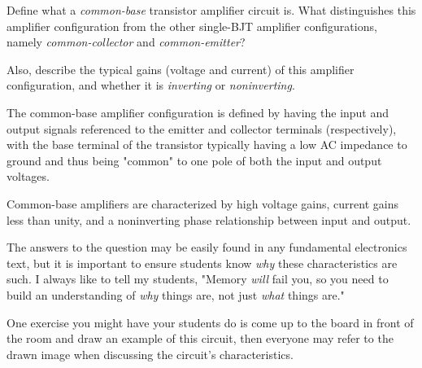 

Define what a {\it common-base} transistor amplifier circuit is.  What distinguishes this amplifier configuration from the other single-BJT amplifier configurations, namely {\it common-collector} and {\it common-emitter}?

Also, describe the typical gains (voltage and current) of this amplifier configuration, and whether it is {\it inverting} or {\it noninverting}.







The common-base amplifier configuration is defined by having the input and output signals referenced to the emitter and collector terminals (respectively), with the base terminal of the transistor typically having a low AC impedance to ground and thus being "common" to one pole of both the input and output voltages.  

Common-base amplifiers are characterized by high voltage gains, current gains less than unity, and a noninverting phase relationship between input and output.







The answers to the question may be easily found in any fundamental electronics text, but it is important to ensure students know {\it why} these characteristics are such.  I always like to tell my students, "Memory {\it will} fail you, so you need to build an understanding of {\it why} things are, not just {\it what} things are."

One exercise you might have your students do is come up to the board in front of the room and draw an example of this circuit, then everyone may refer to the drawn image when discussing the circuit's characteristics.




